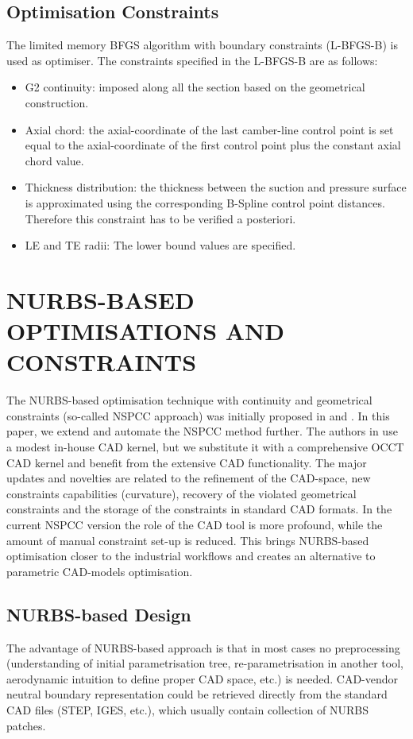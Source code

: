 \documentclass[9pt,academicons]{article}
\begin{document}
\subsection{Optimisation Constraints}

The limited memory BFGS algorithm with boundary constraints (L-BFGS-B) is used as optimiser. The constraints specified in the L-BFGS-B are as follows:

\begin{itemize}[itemsep=0em]
\item G2 continuity: imposed along all the section based on the geometrical construction.
\item Axial chord: the axial-coordinate of the last camber-line control point is set equal to the axial-coordinate of the first control point plus the constant axial chord value.
\item Thickness distribution: the thickness between the suction and pressure surface is approximated using the corresponding B-Spline control point distances. Therefore this constraint has to be verified a posteriori.
\item LE and TE radii: The lower bound values are specified.
\end{itemize}

\section{NURBS-BASED OPTIMISATIONS AND CONSTRAINTS}
\label{sec:nurbs}
The NURBS-based optimisation technique with continuity and geometrical constraints (so-called NSPCC approach) was initially proposed in \cite{xu13:cad-based} and \cite{xu15cad-based}. In this paper, we extend and automate the NSPCC method further. The authors in \cite{xu13:cad-based} use a modest in-house CAD kernel, but we substitute it with a comprehensive OCCT CAD kernel and  benefit from the extensive CAD functionality. The major updates and novelties are related to the refinement of the CAD-space, new constraints capabilities (curvature), recovery of the violated geometrical constraints and the storage of the constraints in standard CAD formats. In the current NSPCC version the role of the CAD tool is more profound, while the amount of manual constraint set-up is reduced. This brings NURBS-based optimisation closer to the industrial workflows and creates an alternative to parametric CAD-models optimisation. 

\subsection{NURBS-based Design}
The advantage of NURBS-based approach is that in most cases no preprocessing (understanding of initial parametrisation tree, re-parametrisation in another tool, aerodynamic intuition to define proper CAD space, etc.) is needed. CAD-vendor neutral boundary representation could be retrieved directly from the standard CAD files (STEP, IGES, etc.), which usually contain collection of NURBS patches.
\end{document}
